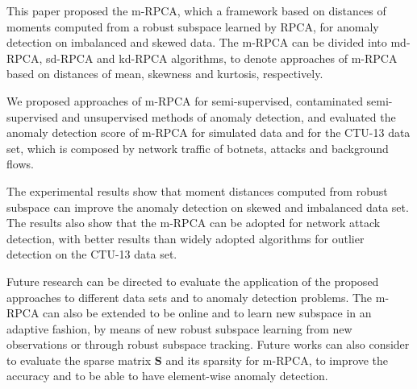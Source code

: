 \documentclass[review]{elsarticle}
\begin{document}
This paper proposed the m-RPCA, which a framework based on distances of moments computed from a robust subspace learned by RPCA, for anomaly detection on imbalanced and skewed data. The m-RPCA can be divided into md-RPCA, sd-RPCA and kd-RPCA algorithms, to denote approaches of m-RPCA based on distances of mean, skewness and kurtosis, respectively. 

We proposed approaches of m-RPCA for semi-supervised, contaminated semi-supervised and unsupervised methods of anomaly detection, and evaluated the anomaly detection score of m-RPCA for simulated data and for the CTU-13 data set, which is composed by network traffic of botnets, attacks and background flows.

The experimental results show that moment distances computed from robust subspace can improve the anomaly detection on skewed and imbalanced data set. The results also show that the m-RPCA can be adopted for network attack detection, with better results than widely adopted algorithms for outlier detection on the CTU-13 data set.

Future research can be directed to evaluate the application of the proposed approaches to different data sets and to anomaly detection problems. The m-RPCA can also be extended to be online and to learn new subspace in an adaptive fashion, by means of new robust subspace learning from new observations or through robust subspace tracking. Future works can also consider to evaluate the sparse matrix $\pmb{S}$ and its sparsity \cite{liu2017tensor} for m-RPCA, to improve the accuracy and to be able to have element-wise anomaly detection.


\end{document}
